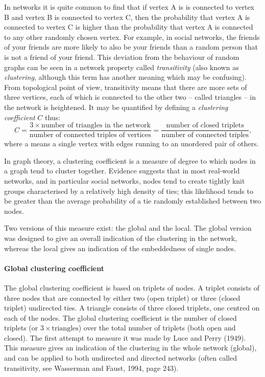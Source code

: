       In networks it is quite common to find that if vertex A is is connected to vertex B and vertex B is connected to vertex C, then the probability that vertex A is connected to vertex C is higher than the probability that vertex A is connected to any other randomly chosen vertex. For example, in social networks, the friends of your friends are more likely to also be your friends than a random person that is not a friend of your friend. This deviation from the behaviour of random graphs can be seen in a network property called \emph{transitivity} (also known as \emph{clustering}, although this term has another meaning which may be confusing). From topological point of view, transitivity means that there are more sets of three vertices, each of which is connected to the other two -- called triangles -- in the network is heightened. It may be quantified by defining a \emph{clustering coefficient} $C$ thus:
      \begin{equation}
        C = \frac{3 \times \mbox{number of triangles in the network}}{\mbox{number of connected triples of vertices}} = \frac{\mbox{number of closed triplets}}{\mbox{number of connected triples}} \mbox{,}
      \end{equation}
      where a  means a single vertex with edges running to an unordered pair of others.

      In graph theory, a clustering coefficient is a measure of degree to which nodes in a graph tend to cluster together. Evidence suggests that in most real-world networks, and in particular social networks, nodes tend to create tightly knit groups characterised by a relatively high density of ties; this likelihood tends to be greater than the average probability of a tie randomly established between two nodes\cite{HollandLeinhardt1971,WattsStrogatz1998}.
           
      Two versions of this measure exist: the global and the local. The global version was designed to give an overall indication of the clustering in the network, whereas the local gives an indication of the embeddedness of single nodes.
          
      \paragraph{Global clustering coefficient}
            
        The global clustering coefficient is based on triplets of nodes. A triplet consists of three nodes that are connected by either two (open triplet) or three (closed triplet) undirected ties. A triangle consists of three closed triplets, one centred on each of the nodes. The global clustering coefficient is the number of closed triplets (or $3 \times \mbox{triangles}$) over the total number of triplets (both open and closed). The first attempt to measure it was made by Luce and Perry (1949)\cite{LucePerry1949}. This measure gives an indication of the clustering in the whole network (global), and can be applied to both undirected and directed networks (often called transitivity, see Wasserman and Faust, 1994, page 243\cite{WassermanFaust1994}).
              
